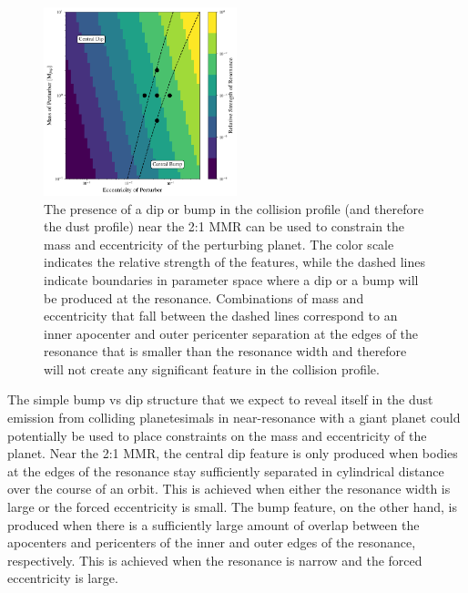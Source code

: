 \documentclass[fleqn,usenatbib]{mnras}
\begin{document}
\begin{figure}
\begin{center}
    \includegraphics[width=0.5\textwidth]{figures/bump_dip_diag.png}
    \caption{The presence of a dip or bump in the collision profile (and therefore the dust profile) near the 2:1 MMR can be used to constrain the mass and eccentricity
    of the perturbing planet. The color scale indicates the relative strength of the features, while the dashed lines
    indicate boundaries in parameter space where a dip or a bump will be produced at the resonance. Combinations of mass and eccentricity that fall 
    between the dashed lines correspond to an inner apocenter and outer pericenter separation at the edges of the resonance that is smaller than the 
    resonance width and therefore will not create any significant feature in the collision profile.\label{fig:bump_dip_diag}}
\end{center}
\end{figure}

The simple bump vs dip structure that we expect to reveal itself in the dust emission from colliding planetesimals in near-resonance with a giant 
planet could potentially be used to place constraints on the mass and eccentricity of the planet. Near the 2:1 MMR, the central dip feature is only 
produced when bodies at the edges of the resonance stay sufficiently separated in cylindrical distance over the course of an orbit. This is achieved 
when either the resonance width is large or the forced eccentricity is small. The bump feature, on the other hand, is produced when there is a 
sufficiently large amount of overlap between the apocenters and pericenters of the inner and outer edges of the resonance, respectively. This is 
achieved when the resonance is narrow and the forced eccentricity is large.
\end{document}
